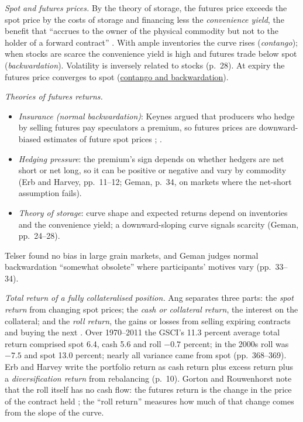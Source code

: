 \begin{qfmethod}\label{meth:commodity-futures-return-components}
 \emph{Spot and futures prices.} By the theory of storage, the futures price exceeds the spot price by the costs of storage and financing less the \emph{convenience yield}, the benefit that ``accrues to the owner of the physical commodity but not to the holder of a forward contract'' \citep[pp.~24--25]{physical-geman-commodities-2005}. With ample inventories the curve rises (\emph{contango}); when stocks are scarce the convenience yield is high and futures trade below spot (\emph{backwardation}). Volatility is inversely related to stocks (p.~28). At expiry the futures price converges to spot (\hyperref[def:contango-backwardation-stocks]{contango and backwardation}).

\emph{Theories of futures returns.}
\begin{itemize}
\item \emph{Insurance (normal backwardation)}: Keynes argued that producers who hedge by selling futures pay speculators a premium, so futures prices are downward-biased estimates of future spot prices \citep[pp.~33--34]{physical-geman-commodities-2005}; \citep[pp.~10--11]{wide-erb-harvey-commodity}.
\item \emph{Hedging pressure}: the premium's sign depends on whether hedgers are net short or net long, so it can be positive or negative and vary by commodity (Erb and Harvey, pp.~11--12; Geman, p.~34, on markets where the net-short assumption fails).
\item \emph{Theory of storage}: curve shape and expected returns depend on inventories and the convenience yield; a downward-sloping curve signals scarcity (Geman, pp.~24--28).
\end{itemize}
Telser found no bias in large grain markets, and Geman judges normal backwardation ``somewhat obsolete'' where participants' motives vary (pp.~33--34).

\emph{Total return of a fully collateralised position.} Ang separates three parts: the \emph{spot return} from changing spot prices; the \emph{cash or collateral return}, the interest on the collateral; and the \emph{roll return}, the gains or losses from selling expiring contracts and buying the next \citep[pp.~367--368]{s7-ang}. Over 1970--2011 the GSCI's 11.3 percent average total return comprised spot 6.4, cash 5.6 and roll $-0.7$ percent; in the 2000s roll was $-7.5$ and spot 13.0 percent; nearly all variance came from spot (pp.~368--369). Erb and Harvey write the portfolio return as cash return plus excess return plus a \emph{diversification return} from rebalancing (p.~10). Gorton and Rouwenhorst note that the roll itself has no cash flow: the futures return is the change in the price of the contract held \citep[p.~6, n.~7]{s16-r34}; the ``roll return'' measures how much of that change comes from the slope of the curve.


\end{qfmethod}
